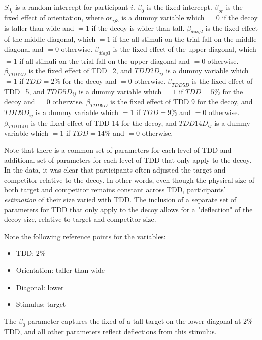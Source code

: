$S_{0_i}$ is a random intercept for participant $i$. $\beta_{0}$ is the fixed intercept. $\beta_{or}$ is the fixed effect of orientation, where $or_{ij3}$ is a dummy variable which $=0$ if the decoy is taller than wide and $=1$ if the decoy is wider than tall. $\beta_{diag2}$ is the fixed effect of the middle diagonal, which $=1$ if the all stimuli on the trial fall on the middle diagonal and $=0$ otherwise. $\beta_{diag3}$ is the fixed effect of the upper diagonal, which $=1$ if all stimuli on the trial fall on the upper diagonal and $=0$ otherwise. $\beta_{TDD2D}$ is the fixed effect of TDD=2, and $TDD2D_{ij}$ is a dummy variable which $=1$ if $TDD=2\%$ for the decoy and $=0$ otherwise.  $\beta_{TDD5D}$ is the fixed effect of TDD=5, and $TDD5D_{ij}$ is a dummy variable which $=1$ if $TDD=5\%$ for the decoy and $=0$ otherwise. $\beta_{TDD9D}$ is the fixed effect of TDD 9 for the decoy, and $TDD9D_{ij}$ is a dummy variable which $=1$ if $TDD=9\%$ and $=0$ otherwise. $\beta_{TDD14D}$ is the fixed effect of TDD 14 for the decoy, and $TDD14D_{ij}$ is a dummy variable which $=1$ if $TDD=14\%$ and $=0$ otherwise. 

Note that there is a common set of parameters for each level of TDD and additional set of parameters for each level of TDD that only apply to the decoy. In the data, it was clear that participants often adjusted the target and competitor relative to the decoy. In other words, even though the physical size of both target and competitor remains constant across TDD, participants' \textit{estimation} of their size varied with TDD. The inclusion of a separate set of parameters for TDD that only apply to the decoy allows for a "deflection" of the decoy size, relative to target and competitor size. 

Note the following reference points for the variables:
\begin{itemize}
    \item TDD: $2\%$
    \item Orientation: taller than wide
    \item Diagonal: lower
    \item Stimulus: target
\end{itemize}

The $\beta_{0}$ parameter captures the fixed of a tall target on the lower diagonal at $2\%$ TDD, and all other parameters reflect deflections from this stimulus.

